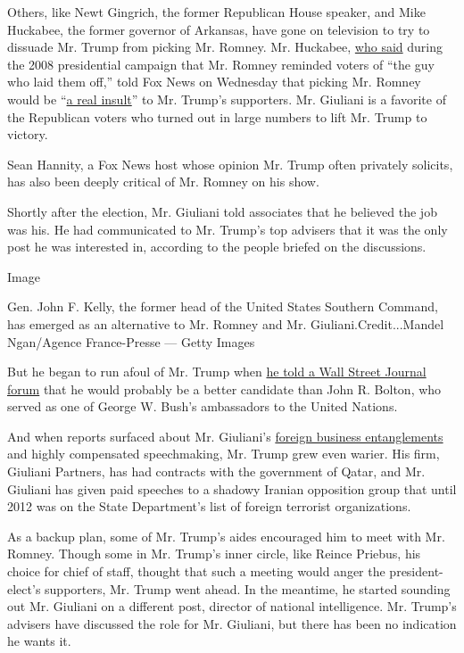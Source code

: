 Others, like Newt Gingrich, the former Republican House speaker, and
Mike Huckabee, the former governor of Arkansas, have gone on television
to try to dissuade Mr. Trump from picking Mr. Romney. Mr. Huckabee,
\href{http://latimesblogs.latimes.com/showtracker/2008/01/excerpts-from-p.html}{who
said} during the 2008 presidential campaign that Mr. Romney reminded
voters of ``the guy who laid them off,'' told Fox News on Wednesday that
picking Mr. Romney would be
``\href{http://insider.foxnews.com/2016/11/23/huckabee-choosing-romney-secy-state-would-be-real-insult-trump-voters}{a
real insult}'' to Mr. Trump's supporters. Mr. Giuliani is a favorite of
the Republican voters who turned out in large numbers to lift Mr. Trump
to victory.

Sean Hannity, a Fox News host whose opinion Mr. Trump often privately
solicits, has also been deeply critical of Mr. Romney on his show.

Shortly after the election, Mr. Giuliani told associates that he
believed the job was his. He had communicated to Mr. Trump's top
advisers that it was the only post he was interested in, according to
the people briefed on the discussions.

Image

Gen. John F. Kelly, the former head of the United States Southern
Command, has emerged as an alternative to Mr. Romney and Mr.
Giuliani.Credit...Mandel Ngan/Agence France-Presse --- Getty Images

But he began to run afoul of Mr. Trump when
\href{http://www.wsj.com/articles/rudy-giuliani-john-bolton-are-leading-candidates-for-next-secretary-of-state-1479156004}{he
told a Wall Street Journal forum} that he would probably be a better
candidate than John R. Bolton, who served as one of George W. Bush's
ambassadors to the United Nations.

And when reports surfaced about Mr. Giuliani's
\href{http://www.nytimes3xbfgragh.onion/2016/11/16/us/politics/donald-trump-cabinet-rudy-giuliani.html?_r=0}{foreign
business entanglements} and highly compensated speechmaking, Mr. Trump
grew even warier. His firm, Giuliani Partners, has had contracts with
the government of Qatar, and Mr. Giuliani has given paid speeches to a
shadowy Iranian opposition group that until 2012 was on the State
Department's list of foreign terrorist organizations.

As a backup plan, some of Mr. Trump's aides encouraged him to meet with
Mr. Romney. Though some in Mr. Trump's inner circle, like Reince
Priebus, his choice for chief of staff, thought that such a meeting
would anger the president-elect's supporters, Mr. Trump went ahead. In
the meantime, he started sounding out Mr. Giuliani on a different post,
director of national intelligence. Mr. Trump's advisers have discussed
the role for Mr. Giuliani, but there has been no indication he wants it.

